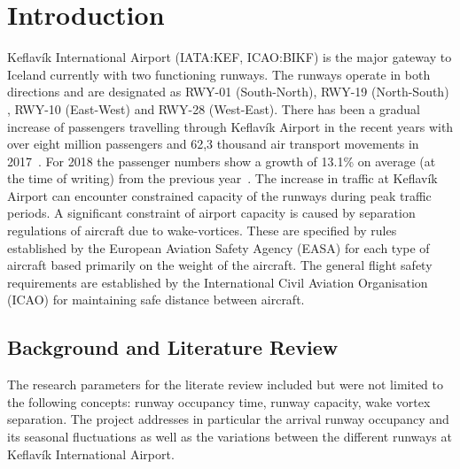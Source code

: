 \chapter{Introduction\label{cha:introduction}}

Keflavík International Airport (IATA:KEF, ICAO:BIKF) is the major gateway to Iceland currently with two functioning runways. The runways operate in both directions and are designated as RWY-01 (South-North), RWY-19 (North-South) , RWY-10 (East-West) and RWY-28 (West-East). 
There has been a gradual increase of passengers travelling through Keflavík Airport in the recent years with over eight million passengers and 62,3 thousand air transport movements in 2017~\cite{isavia_facts_2017}. For 2018 the passenger numbers show a growth of 13.1\% on average (at the time of writing) from the previous year~\cite{isavia_pass_statistics_2018}. The increase in traffic at Keflavík Airport can encounter constrained capacity of the runways during peak traffic periods. 
A significant constraint of airport capacity is caused by separation regulations of aircraft due to wake-vortices. These are specified by rules established by the European Aviation Safety Agency (EASA) for each type of aircraft based primarily on the weight of the aircraft. The general flight safety requirements are established by the International Civil Aviation Organisation (ICAO) for maintaining safe distance between aircraft.

\section{Background and Literature Review}
The research parameters for the literate review included but were not limited to the following concepts: runway occupancy time, runway capacity, wake vortex separation. The project addresses in particular the arrival runway occupancy and its seasonal fluctuations as well as the variations between the different runways at Keflavík International Airport.

